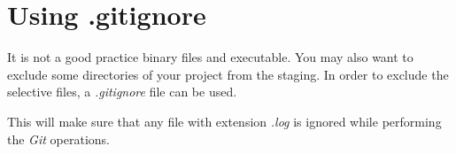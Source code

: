 \documentclass[letterpaper]{article}
\begin{document}
\section{Using .gitignore}
It is not a good practice binary files and executable. You may also want to exclude some directories of your project from the staging. In order to exclude the selective files, a \textit{.gitignore} file can be used.

This will make sure that any file with extension \textit{.log} is ignored while performing the \textit{Git} operations. 
\end{document}
